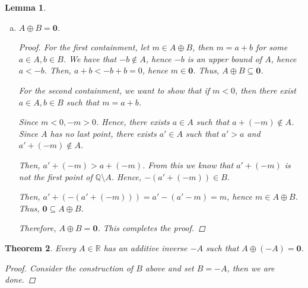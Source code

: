 \documentclass[11pt]{article}
\newcommand{\bbQ}{\mathbb{Q}}
\newcommand{\bbR}{\mathbb{R}}
\newtheorem{theorem}{Theorem}[section]
\newtheorem{lemma}[theorem]{Lemma}
\theoremstyle{definition}
\numberwithin{equation}{subsection}
\begin{document}
\begin{lemma}
\begin{enumerate}[(a)]
\begin{proof}
Let $b \in B$, then $-b \notin A$ and $-b$ is not a first point of $\bbQ \setminus A$. Since $\bbQ$ is dense, there exists $c \in \bbQ \setminus A$ such that $c<-b$, $c \notin A$ and $c$ is not a first point of $\bbQ \setminus A$. Then, $-c\in B, -c>b$, hence $B$ has no last point.

This demonstrates that $B$ is a Dedekind cut, i.e., $B \in \bbR$.

\renewcommand\qedsymbol{QED}
\end{proof}
		\item $A \oplus B = \mathbf{0}$.
            
\begin{proof}
For the first containment, let $m \in A \oplus B$, then $m=a+b$ for some $a\in A, b\in B$. We have that $-b \notin A$, hence $-b$ is an upper bound of $A$, hence $a<-b$. Then, $a+b<-b+b=0$, hence $m \in \mathbf{0}$. Thus, $A \oplus B \subseteq \mathbf{0}$.

For the second containment, we want to show that if $m<0$, then there exist $a\in A, b\in B$ such that $m=a+b$. 

Since $m<0, -m>0$. Hence, there exists $a \in A$ such that $a+(-m) \notin A$. Since $A$ has no last point, there exists $a' \in A$ such that $a'>a$ and $a'+(-m) \notin A$. 

Then, $a'+(-m)>a+(-m)$. From this we know that $a'+(-m)$ is not the first point of $\bbQ \setminus A$. Hence, $-(a'+(-m)) \in B$.

Then, $a'+(-(a'+(-m))) = a' - (a' -m) = m$, hence $m \in A \oplus B$. Thus, $\mathbf{0} \subseteq A \oplus B$.

Therefore, $A \oplus B = \mathbf{0}$. This completes the proof.

\renewcommand\qedsymbol{QED}
\end{proof}
		
	\end{enumerate}

\end{lemma}
\begin{theorem}
	Every $A \in \bbR$ has an additive inverse $-A$ such that $A \oplus (-A) = \mathbf{0}$. 
        
\begin{proof}
Consider the construction of $B$ above and set $B =-A$, then we are done.

\renewcommand\qedsymbol{QED}
\end{proof}
\end{theorem}
\end{document}

